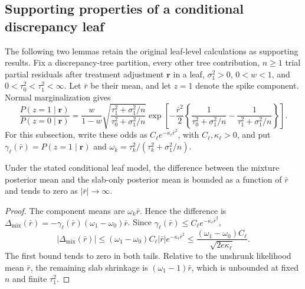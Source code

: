 \subsection{Supporting properties of a conditional discrepancy leaf}\label{sec:C.5}
The following two lemmas retain the original leaf-level calculations as supporting results. Fix a discrepancy-tree partition, every other tree contribution, $n\geq1$ trial partial residuals after treatment adjustment $\mathbf r$ in a leaf, $\sigma_1^2>0$, $0<w<1$, and $0<\tau_0^2<\tau_1^2<\infty$. Let $\bar r$ be their mean, and let $z=1$ denote the spike component. Normal marginalization gives
\begin{equation}\label{eq:odds}
\frac{P(z=1\mid\mathbf r)}{P(z=0\mid\mathbf r)}
=\frac{w}{1-w}\sqrt{\frac{\tau_1^2+\sigma_1^2/n}{\tau_0^2+\sigma_1^2/n}}
\exp\left[-\frac{\bar r^2}{2}
\left\{\frac{1}{\tau_0^2+\sigma_1^2/n}-\frac{1}{\tau_1^2+\sigma_1^2/n}\right\}\right].
\end{equation}
For this subsection, write these odds as $C_{\ell}e^{-\kappa_{\ell}\bar r^2}$, with $C_{\ell},\kappa_{\ell}>0$, and put $\gamma_{\ell}(\bar r)=P(z=1\mid\mathbf r)$ and $\omega_k=\tau_k^2/(\tau_k^2+\sigma_1^2/n)$.

\begin{lemma}\label{lem:leaf_shrinkage}
Under the stated conditional leaf model, the difference between the mixture posterior mean and the slab-only posterior mean is bounded as a function of $\bar r$ and tends to zero as $|\bar r|\to\infty$.
\end{lemma}
\begin{proof}
The component means are $\omega_k\bar r$. Hence the difference is $\Delta_{\mathrm{mix}}(\bar r)=-\gamma_{\ell}(\bar r)(\omega_1-\omega_0)\bar r$. Since $\gamma_{\ell}(\bar r)\leq C_{\ell}e^{-\kappa_{\ell}\bar r^2}$,
\[
|\Delta_{\mathrm{mix}}(\bar r)|\leq(\omega_1-\omega_0)C_{\ell}|\bar r|e^{-\kappa_{\ell}\bar r^2}
\leq\frac{(\omega_1-\omega_0)C_{\ell}}{\sqrt{2e\kappa_{\ell}}}.
\]
The first bound tends to zero in both tails. Relative to the unshrunk likelihood mean $\bar r$, the remaining slab shrinkage is $(\omega_1-1)\bar r$, which is unbounded at fixed $n$ and finite $\tau_1^2$.
\end{proof}

